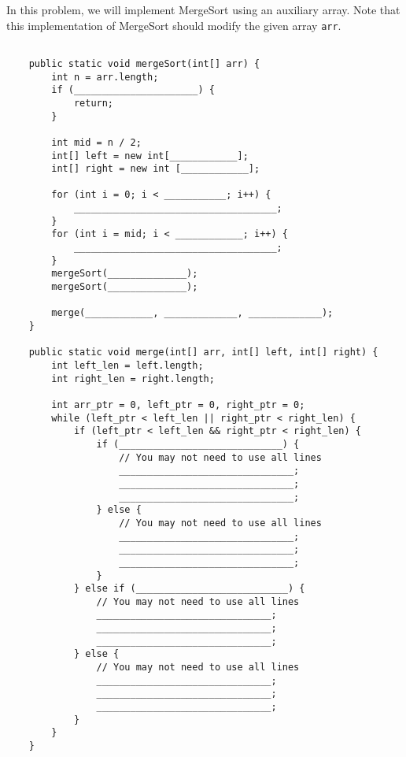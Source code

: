 \question In this problem, we will implement MergeSort using an auxiliary array.
Note that this implementation of MergeSort should modify the given array \lstinline{arr}.

\begin{lstlisting}

    public static void mergeSort(int[] arr) {
        int n = arr.length;
        if (______________________) {
            return;
        }
        
        int mid = n / 2;
        int[] left = new int[____________];
        int[] right = new int [____________];

        for (int i = 0; i < ___________; i++) {
            ____________________________________;
        }
        for (int i = mid; i < ____________; i++) {
            ____________________________________;
        }
        mergeSort(______________);
        mergeSort(______________);

        merge(____________, _____________, _____________);
    }

    public static void merge(int[] arr, int[] left, int[] right) {
        int left_len = left.length;
        int right_len = right.length;

        int arr_ptr = 0, left_ptr = 0, right_ptr = 0;
        while (left_ptr < left_len || right_ptr < right_len) {
            if (left_ptr < left_len && right_ptr < right_len) {
                if (_____________________________) {
                    // You may not need to use all lines
                    _______________________________;
                    _______________________________;
                    _______________________________;
                } else {
                    // You may not need to use all lines
                    _______________________________;
                    _______________________________;
                    _______________________________;
                }
            } else if (___________________________) {
                // You may not need to use all lines
                _______________________________;
                _______________________________;
                _______________________________;
            } else {
                // You may not need to use all lines
                _______________________________;
                _______________________________;
                _______________________________;
            }
        }
    }
\end{lstlisting}

